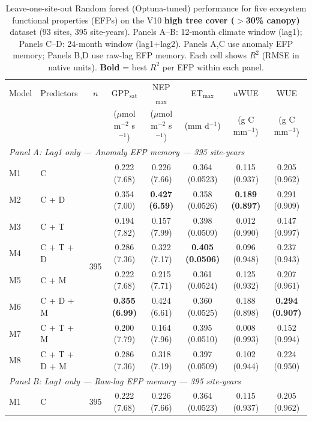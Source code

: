 \begin{table}[htbp]
\centering
\caption{Leave-one-site-out Random forest (Optuna-tuned) performance for five ecosystem functional properties (EFPs) on the V10 \textbf{high tree cover ($>$30\% canopy)} dataset (93 sites, 395 site-years). Panels A--B: 12-month climate window (lag1); Panels C--D: 24-month window (lag1+lag2). Panels A,C use anomaly EFP memory; Panels B,D use raw-lag EFP memory. Each cell shows $R^2$ (RMSE in native units). \textbf{Bold} = best $R^2$ per EFP within each panel.}
\label{tab:RFoptuna_LOSO_v10_filtered}
\footnotesize
\setlength{\tabcolsep}{4pt}
\begin{tabular}{llcccccc}
\toprule
Model & Predictors & $n$ & GPP$_\mathrm{sat}$ & NEP$_\mathrm{max}$ & ET$_\mathrm{max}$ & uWUE & WUE \\
  &  &  & ($\mu$mol m$^{-2}$ s$^{-1}$) & ($\mu$mol m$^{-2}$ s$^{-1}$) & (mm d$^{-1}$) & (g C mm$^{-1}$) & (g C mm$^{-1}$) \\
\midrule
\multicolumn{8}{l}{\textit{Panel A: Lag1 only --- Anomaly EFP memory --- 395 site-years}} \\
\midrule
M1 & C & \multirow{8}{*}{395} & 0.222 (7.68) & 0.226 (7.66) & 0.364 (0.0523) & 0.115 (0.937) & 0.205 (0.962) \\
M2 & C + D &  & 0.354 (7.00) & \textbf{0.427 (6.59)} & 0.358 (0.0526) & \textbf{0.189 (0.897)} & 0.291 (0.909) \\
M3 & C + T &  & 0.194 (7.82) & 0.157 (7.99) & 0.398 (0.0509) & 0.012 (0.990) & 0.147 (0.997) \\
M4 & C + T + D &  & 0.286 (7.36) & 0.322 (7.17) & \textbf{0.405 (0.0506)} & 0.096 (0.948) & 0.237 (0.943) \\
M5 & C + M &  & 0.222 (7.68) & 0.215 (7.71) & 0.361 (0.0524) & 0.125 (0.932) & 0.207 (0.961) \\
M6 & C + D + M &  & \textbf{0.355 (6.99)} & 0.424 (6.61) & 0.360 (0.0525) & 0.188 (0.898) & \textbf{0.294 (0.907)} \\
M7 & C + T + M &  & 0.200 (7.79) & 0.164 (7.96) & 0.395 (0.0510) & 0.008 (0.993) & 0.152 (0.994) \\
M8 & C + T + D + M &  & 0.286 (7.36) & 0.318 (7.19) & 0.397 (0.0509) & 0.102 (0.944) & 0.224 (0.950) \\
\midrule
\multicolumn{8}{l}{\textit{Panel B: Lag1 only --- Raw-lag EFP memory --- 395 site-years}} \\
\midrule
M1 & C & \multirow{8}{*}{395} & 0.222 (7.68) & 0.226 (7.66) & 0.364 (0.0523) & 0.115 (0.937) & 0.205 (0.962) \\

\end{tabular}
\end{table}
